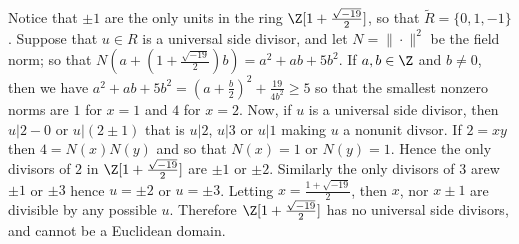 \begin{example}\label{2.3}
    Notice that $\pm 1$ are the only units in the ring
    $\Z[1+\frac{\sqrt{-19}}{2}]$, so that $\tilde{R}=\{0,1,-1\}$. Suppose that
    $u \in R$ is a universal side divisor, and let $N=\|\cdot\|^2$ be the field
    norm; so that $N(a+(1+\frac{\sqrt{-19}}{2})b)=a^2+ab+5b^2$. If $a,b \in \Z$
    and $b \neq 0$, then we have $a^2+ab+5b^2=(a+\frac{b}{2})^2+\frac{19}{4b^2}
    \geq 5$ so that the smallest nonzero norms are $1$ for $x=1$ and $4$ for $x=2$.
    Now, if $u$ is a universal side divisor, then  $u|2-0$ or  $u|(2 \pm 1)$
    that is $u|2$,  $u|3$ or  $u|1$ making  $u$ a nonunit divsor. If  $2=xy$
    then $4=N(x)N(y)$ and so that $N(x)=1$ or  $N(y)=1$. Hence the only
    divisors of $2$ in  $\Z[1+\frac{\sqrt{-19}}{2}]$ are $\pm 1$ or  $\pm 2$.
    Similarly the only divisors of  $3$ arew  $\pm 1$ or  $\pm 3$ hence  $u=\pm
    2$ or  $u=\pm 3$. Letting  $x=\frac{1+\sqrt{-19}}{2}$, then $x$, nor  $x
    \pm 1$ are divisible by any possible $u$. Therefore
    $\Z[1+\frac{\sqrt{-19}}{2}]$ has no universal side divisors, and cannot be a
    Euclidean domain.
    \end{example}
